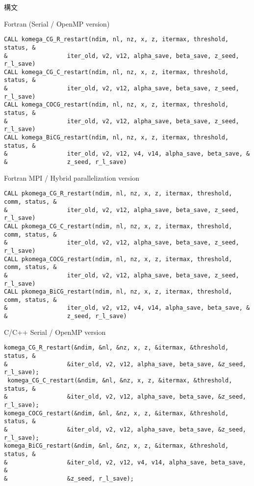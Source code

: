 \documentclass[12pt,titlepage]{article}
\begin{document}
  \noindent 構文
  
  \noindent Fortran (Serial / OpenMP version)
  
\begin{verbatim}
CALL komega_CG_R_restart(ndim, nl, nz, x, z, itermax, threshold, status, &
&                 iter_old, v2, v12, alpha_save, beta_save, z_seed, r_l_save)
CALL komega_CG_C_restart(ndim, nl, nz, x, z, itermax, threshold, status, &
&                 iter_old, v2, v12, alpha_save, beta_save, z_seed, r_l_save)
CALL komega_COCG_restart(ndim, nl, nz, x, z, itermax, threshold, status, &
&                 iter_old, v2, v12, alpha_save, beta_save, z_seed, r_l_save)
CALL komega_BiCG_restart(ndim, nl, nz, x, z, itermax, threshold, status, &
&                 iter_old, v2, v12, v4, v14, alpha_save, beta_save, &
&                 z_seed, r_l_save)
\end{verbatim}

  \noindent Fortran MPI / Hybrid parallelization version
  
\begin{verbatim}
CALL pkomega_CG_R_restart(ndim, nl, nz, x, z, itermax, threshold, comm, status, &
&                 iter_old, v2, v12, alpha_save, beta_save, z_seed, r_l_save)
CALL pkomega_CG_C_restart(ndim, nl, nz, x, z, itermax, threshold, comm, status, &
&                 iter_old, v2, v12, alpha_save, beta_save, z_seed, r_l_save)
CALL pkomega_COCG_restart(ndim, nl, nz, x, z, itermax, threshold, comm, status, &
&                 iter_old, v2, v12, alpha_save, beta_save, z_seed, r_l_save)
CALL pkomega_BiCG_restart(ndim, nl, nz, x, z, itermax, threshold, comm, status, &
&                 iter_old, v2, v12, v4, v14, alpha_save, beta_save, &
&                 z_seed, r_l_save)
\end{verbatim}

\noindent C/C++ Serial / OpenMP version
  
\begin{verbatim}
komega_CG_R_restart(&ndim, &nl, &nz, x, z, &itermax, &threshold, status, &
&                 &iter_old, v2, v12, alpha_save, beta_save, &z_seed, r_l_save);
 komega_CG_C_restart(&ndim, &nl, &nz, x, z, &itermax, &threshold, status, &
&                 &iter_old, v2, v12, alpha_save, beta_save, &z_seed, r_l_save);
komega_COCG_restart(&ndim, &nl, &nz, x, z, &itermax, &threshold, status, &
&                 &iter_old, v2, v12, alpha_save, beta_save, &z_seed, r_l_save);
komega_BiCG_restart(&ndim, &nl, &nz, x, z, &itermax, &threshold, status, &
&                 &iter_old, v2, v12, v4, v14, alpha_save, beta_save, &
&                 &z_seed, r_l_save);
\end{verbatim}
\end{document}
